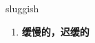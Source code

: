 
\begin{frame}
{\huge sluggish}
\begin{center}
\begin{enumerate}\Large
  \item \textbf{缓慢的，迟缓的}
\end{enumerate}
\end{center}
\end{frame}
